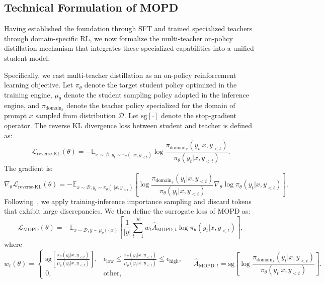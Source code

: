 \subsection{Technical Formulation of MOPD}
\label{subsec:mopd-technical}

Having established the foundation through SFT and trained specialized teachers through domain-specific RL, we now formalize the multi-teacher on-policy distillation mechanism that integrates these specialized capabilities into a unified student model.

Specifically, we cast multi-teacher distillation as an on-policy reinforcement learning objective. Let $\pi_\theta$ denote the target student policy optimized in the training engine, $\mu_\theta$ denote the student sampling policy adopted in the inference engine, and $\pi_{\text{domain}_x}$ denote the teacher policy specialized for the domain of prompt $x$ sampled from distribution $\mathcal{D}$. Let $\text{sg}[\cdot]$ denote the stop-gradient operator. The reverse KL divergence loss between student and teacher is defined as:
\begin{equation}
    \mathcal{L}_\text{reverse-KL}(\theta)
  =-\mathbb{E}_{x\sim\mathcal{D},  y_{t}\sim \pi_\theta(\cdot|x, y_{<t})}\log\frac{ \pi_{\text{domain}_x}(y_{t}|x, y_{<t})}{ \pi_\theta(y_{t}|x, y_{<t})}.
\end{equation}
The gradient is:
\begin{equation}
    \nabla_{\theta}\mathcal{L}_\text{reverse-KL}(\theta)
  =-\mathbb{E}_{x\sim\mathcal{D},  y_{t}\sim \pi_\theta(\cdot|x, y_{<t})}\left[\log\frac{ \pi_{\text{domain}_x}(y_{t}|x, y_{<t})}{ \pi_\theta(y_{t}|x, y_{<t})} \nabla_\theta \log \pi_\theta(y_{t}|x, y_{<t})\right].
\end{equation}
Following~\citet{IcePop2025}, we apply training-inference importance sampling and discard tokens that exhibit large discrepancies. We then define the surrogate loss of MOPD as:
\begin{equation}
\mathcal{L}_{\text{MOPD}}(\theta) = -\mathbb{E}_{x \sim\mathcal{D}, y \sim \mu_{\theta}(\cdot|x)}
\left[\frac{1}{|y|}\sum_{t=1}^{|y|}
  w_{t} \hat{A}_{\text{MOPD},t}\log\pi_{\theta}(y_{t}|x, y_{<t}) \right],
\end{equation}
where
\begin{equation}
    w_{t}(\theta)=
\begin{cases}
\text{sg}\left[\frac{\pi_\theta(y_{t}|x, y_{<t})}{\mu_\theta(y_{t}|x, y_{<t})}\right], & \epsilon_{\text{low}} \le \frac{\pi_\theta(y_{t}|x, y_{<t})}{\mu_\theta(y_{t}|x, y_{<t})} \le \epsilon_{\text{high}}, \\
0,  & \text{other},
\end{cases}
\quad
    \ \hat{A}_{\text{MOPD},t} = \text{sg}\left[\log\frac{ \pi_{\text{domain}_x}(y_{t}|x, y_{<t})}{ \pi_\theta(y_{t}|x, y_{<t})}\right].
\label{eq:advantage_calculation}
\end{equation}

